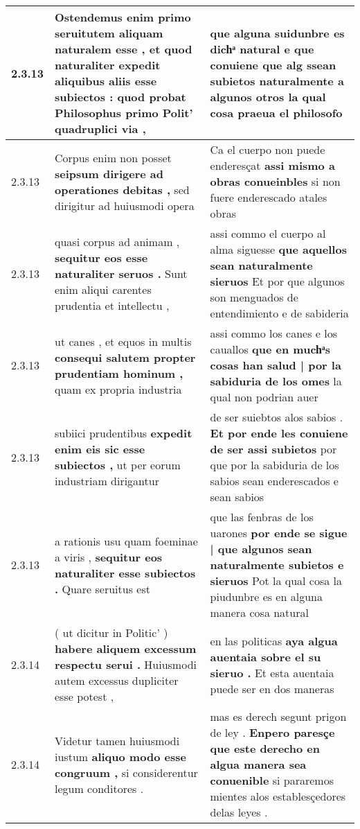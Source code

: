 \begin{tabular}{|p{1cm}|p{6.5cm}|p{6.5cm}|}
2.3.13 & Ostendemus enim primo seruitutem aliquam naturalem esse , \textbf{ et quod naturaliter expedit aliquibus aliis esse subiectos : } quod probat Philosophus primo Polit’ quadruplici via , & que alguna suidunbre es dichͣ natural \textbf{ e que conuiene que alg ssean subietos naturalmente a algunos otros } la qual cosa praeua el philosofo \\\hline
2.3.13 & Corpus enim non posset \textbf{ seipsum dirigere ad operationes debitas , } sed dirigitur ad huiusmodi opera & Ca el cuerpo non puede enderesçat \textbf{ assi mismo a obras conueinbles } si non fuere enderescado atales obras \\\hline
2.3.13 & quasi corpus ad animam , \textbf{ sequitur eos esse naturaliter seruos . } Sunt enim aliqui carentes prudentia et intellectu , & assi commo el cuerpo al alma siguesse \textbf{ que aquellos sean naturalmente sieruos } Et por que algunos son menguados de entendimiento e de sabideria \\\hline
2.3.13 & ut canes , et equos in multis \textbf{ consequi salutem propter prudentiam hominum , } quam ex propria industria & assi commo los canes e los cauallos \textbf{ que en muchͣs cosas han salud | por la sabiduria de los omes } la qual non podrian auer \\\hline
2.3.13 & subiici prudentibus \textbf{ expedit enim eis sic esse subiectos , } ut per eorum industriam dirigantur & de ser suiebtos alos sabios . \textbf{ Et por ende les conuiene de ser assi subietos } por que por la sabiduria de los sabios sean enderescados e sean sabios \\\hline
2.3.13 & a rationis usu quam foeminae a viris , \textbf{ sequitur eos naturaliter esse subiectos . } Quare seruitus est & que las fenbras de los uarones \textbf{ por ende se sigue | que algunos sean naturalmente subietos e sieruos } Pot la qual cosa la piudunbre es en alguna manera cosa natural \\\hline
2.3.14 & ( ut dicitur in Politic’ ) \textbf{ habere aliquem excessum respectu serui . } Huiusmodi autem excessus dupliciter esse potest , & en las politicas \textbf{ aya algua auentaia sobre el su sieruo . } Et esta auentaia puede ser en dos maneras \\\hline
2.3.14 & Videtur tamen huiusmodi iustum \textbf{ aliquo modo esse congruum , } si considerentur legum conditores . & mas es derech segunt prigon de ley . \textbf{ Enpero paresçe que este derecho en algua manera sea conuenible } si pararemos mientes alos establesçedores delas leyes . \\\hline

\end{tabular}
